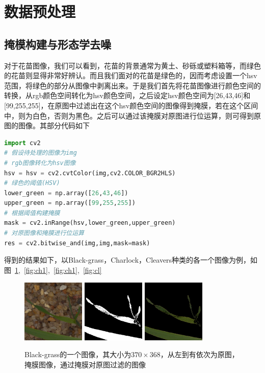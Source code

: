 \section{数据预处理}
\subsection{掩模构建与形态学去噪}
对于花苗图像，我们可以看到，花苗的背景通常为黄土、砂砾或塑料箱等，而绿色的花苗则显得非常好辨认。而且我们面对的花苗是绿色的，因而考虑设置一个hsv范围，将绿色的部分从图像中剥离出来。于是我们首先将花苗图像进行颜色空间的转换，从rgb颜色空间转化为hsv颜色空间，之后设定hsv颜色空间为[26,43,46]和[99,255,255]，在原图中过滤出在这个hsv颜色空间的图像得到掩膜，若在这个区间中，则为白色，否则为黑色。之后可以通过该掩膜对原图进行位运算，则可得到原图的图像。其部分代码如下
\begin{lstlisting}[language=python]
import cv2
# 假设待处理的图像为img
# rgb图像转化为hsv图像
hsv = hsv = cv2.cvtColor(img,cv2.COLOR_BGR2HLS)
# 绿色的阈值(HSV)
lower_green = np.array([26,43,46])
upper_green = np.array([99,255,255])
# 根据阈值构建掩膜
mask = cv2.inRange(hsv,lower_green,upper_green)
# 对原图像和掩膜进行位运算
res = cv2.bitwise_and(img,img,mask=mask)
\end{lstlisting}
得到的结果如下，以Black-grass，Charlock，Cleavers种类的各一个图像为例，如图~\ref{fig:bg1},~\ref{fig:ch1},~\ref{fig:ch1},~\ref{fig:cl}

\begin{figure}[htbp]
\centering
\includegraphics[width=30mm,height=30mm]{../figures/Black-grass_1af1eddd3.png} 
\includegraphics[width=30mm,height=30mm]{../figures/Black-grass_1af1eddd3_mask.png} 	
\includegraphics[width=30mm,height=30mm]{../figures/Black-grass_1af1eddd3_res.png} 
\caption{Black-grass的一个图像，其大小为$370\times 368$，从左到有依次为原图，掩膜图像，通过掩膜对原图过滤的图像}
\label{fig:bg1} 
\end{figure}

